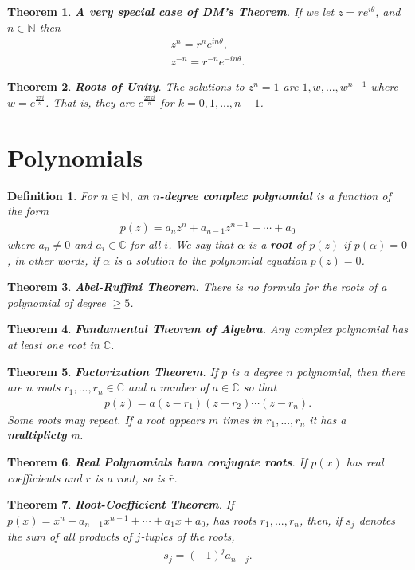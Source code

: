 \documentclass{article}
\theoremstyle{sltheorem}
\newtheorem{definition}{Definition}[section]
\newtheorem{theorem}{Theorem}[section]
\newcommand{\N}{\mathbb{N}}
\newcommand{\C}{\mathbb{C}}
\newcommand*\B[1]{\textbf{#1}}
\begin{document}
\begin{theorem}
    \B{A very special case of DM's Theorem}. If we let $z=re^{i\theta}$, and $n\in\N$ then
    \begin{align*}
        z^n = r^ne^{in\theta},\\
        z^{-n} = r^{-n}e^{-in\theta}.
    \end{align*}
\end{theorem}
\begin{theorem}
    \B{Roots of Unity}. The solutions to $z^n=1$ are $1,w,...,w^{n-1}$ where $w=e^{\frac{2\pi i}{n}}$. That is, they are $e^{\frac{2\pi ki}{n}}$ for $k=0,1,...,n-1$.
\end{theorem}
\section{Polynomials}
\begin{definition}
    For $n\in\N$, an \B{$n$-degree complex polynomial} is a function of the form
    \begin{align*}
        p(z)=a_nz^n+a_{n-1}z^{n-1}+\cdots+a_0
    \end{align*}
    where $a_n\not=0$ and $a_i\in\C$ for all $i$. We say that $\alpha$ is a \B{root} of $p(z)$ if $p(\alpha)=0$, in other words, if $\alpha$ is a solution to the polynomial equation $p(z)=0$.
\end{definition}
\begin{theorem}
    \B{Abel-Ruffini Theorem}. There is no formula for the roots of a polynomial of degree $\geq 5$.
\end{theorem}
\begin{theorem}
    \B{Fundamental Theorem of Algebra}. Any complex polynomial has at least one root in $\C$.
\end{theorem}
\begin{theorem}
    \B{Factorization Theorem}. If $p$ is a degree $n$ polynomial, then there are $n$ roots $r_1,...,r_n\in\C$ and a number of $a\in\C$ so that
    \begin{align*}
        p(z)=a(z-r_1)(z-r_2)\cdots(z-r_n).
    \end{align*}
    Some roots may repeat. If a root appears $m$ times in $r_1, ..., r_n$ it has a \B{multiplicty} m.
\end{theorem}
\begin{theorem}
    \B{Real Polynomials hava conjugate roots}. If $p(x)$ has real coefficients and $r$ is a root, so is $\bar{r}$.
\end{theorem}
\begin{theorem}
    \B{Root-Coefficient Theorem}. If $p(x)=x^n+a_{n-1}x^{n-1}+\cdots+a_1x+a_0$, has roots $r_1, ..., r_n$, then, if $s_j$ denotes the sum of all products of $j$-tuples of the roots,
    \begin{align*}
        s_j=(-1)^ja_{n-j}.
    \end{align*}
\end{theorem}
\end{document}
